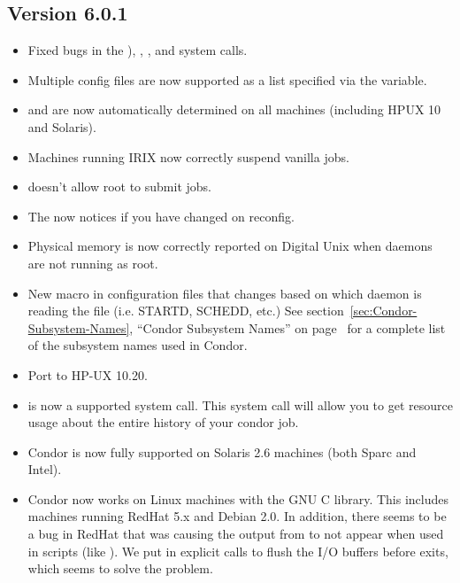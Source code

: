 \subsection{\label{sec:New-6-0-1}Version 6.0.1}

\begin{itemize}

\item Fixed bugs in the ), ,
, and  system calls. 

\item Multiple config files are now supported as a list specified via
the  variable. 

\item {} and  are now automatically determined
on all machines (including HPUX 10 and Solaris). 

\item Machines running IRIX now correctly suspend vanilla jobs.

\item {} doesn't allow root to submit jobs.

\item The  now notices if you have changed
 on reconfig.

\item Physical memory is now correctly reported on Digital Unix when
daemons are not running as root. 

\item New  macro in configuration files that changes
based on which daemon is reading the file (i.e. STARTD, SCHEDD, etc.) 
See section~\ref{sec:Condor-Subsystem-Names}, ``Condor Subsystem
Names'' on page~\pageref{sec:Condor-Subsystem-Names} for a complete
list of the subsystem names used in Condor.

\item Port to HP-UX 10.20.  

\item {} is now a supported system call.  
This system call will allow you to get resource usage about the entire
history of your condor job.

\item Condor is now fully supported on Solaris 2.6 machines (both
Sparc and Intel). 

\item Condor now works on Linux machines with the GNU C library.  
This includes machines running RedHat 5.x and Debian 2.0. 
In addition, there seems to be a bug in RedHat that was causing the
output from  to not appear when used in scripts
(like ).
We put in explicit calls to flush the I/O buffers before
 exits, which seems to solve the problem.


\end{itemize}
